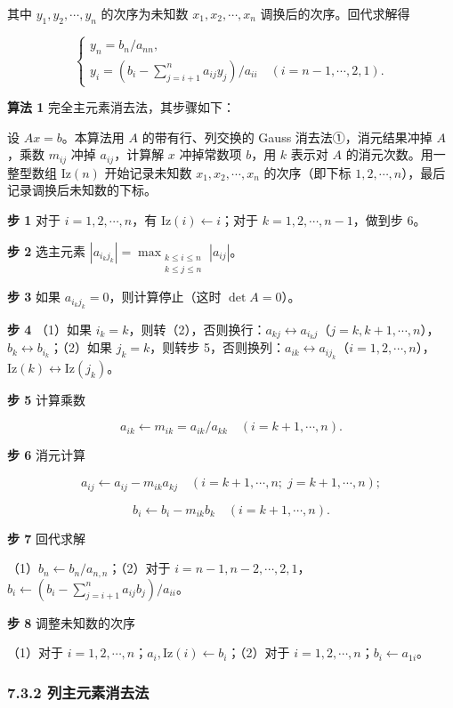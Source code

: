 其中 \(y_1,y_2,\cdots,y_n\) 的次序为未知数 \(x_1,x_2,\cdots,x_n\) 调换后的次序。回代求解得

\[
\begin{cases}
y_n=b_n/a_{nn},\\
y_i=\displaystyle\left(b_i-\sum_{j=i+1}^{n}a_{ij}y_j\right)/a_{ii}\quad(i=n-1,\cdots,2,1).
\end{cases}
\]

\textbf{算法 1} 完全主元素消去法，其步骤如下：

设 \(Ax=b\)。本算法用 \(A\) 的带有行、列交换的 Gauss 消去法①，消元结果冲掉 \(A\)，乘数 \(m_{ij}\) 冲掉 \(a_{ij}\)，计算解 \(x\) 冲掉常数项 \(b\)，用 \(k\) 表示对 \(A\) 的消元次数。用一整型数组 \(\mathrm{Iz}(n)\) 开始记录未知数 \(x_1,x_2,\cdots,x_n\) 的次序（即下标 \(1,2,\cdots,n\)），最后记录调换后未知数的下标。

\textbf{步 1} 对于 \(i=1,2,\cdots,n\)，有 \(\mathrm{Iz}(i)\leftarrow i\)；对于 \(k=1,2,\cdots,n-1\)，做到步 6。

\textbf{步 2} 选主元素 \(|a_{i_kj_k}|=\max_{\substack{k\le i\le n\\k\le j\le n}}|a_{ij}|\)。

\textbf{步 3} 如果 \(a_{i_kj_k}=0\)，则计算停止（这时 \(\det A=0\)）。

\textbf{步 4} （1）如果 \(i_k=k\)，则转（2），否则换行：\(a_{kj}\leftrightarrow a_{i_kj}\)（\(j=k,k+1,\cdots,n\)），\(b_k\leftrightarrow b_{i_k}\)；（2）如果 \(j_k=k\)，则转步 5，否则换列：\(a_{ik}\leftrightarrow a_{ij_k}\)（\(i=1,2,\cdots,n\)），\(\mathrm{Iz}(k)\leftrightarrow\mathrm{Iz}(j_k)\)。

\textbf{步 5} 计算乘数

\[a_{ik}\leftarrow m_{ik}=a_{ik}/a_{kk}\quad(i=k+1,\cdots,n).\]

\textbf{步 6} 消元计算

\[a_{ij}\leftarrow a_{ij}-m_{ik}a_{kj}\quad(i=k+1,\cdots,n;\;j=k+1,\cdots,n);\]

\[b_i\leftarrow b_i-m_{ik}b_k\quad(i=k+1,\cdots,n).\]

\textbf{步 7} 回代求解

（1）\(b_n\leftarrow b_n/a_{n,n}\)；（2）对于 \(i=n-1,n-2,\cdots,2,1\)，\(b_i\leftarrow\left(b_i-\sum_{j=i+1}^{n}a_{ij}b_j\right)/a_{ii}\)。

\textbf{步 8} 调整未知数的次序

（1）对于 \(i=1,2,\cdots,n\)；\(a_i,\mathrm{Iz}(i)\leftarrow b_i\)；（2）对于 \(i=1,2,\cdots,n\)；\(b_i\leftarrow a_{1i}\)。

\subsubsection{7.3.2 列主元素消去法}\label{ch07a-ux5217ux4e3bux5143ux7d20ux6d88ux53bbux6cd5}


